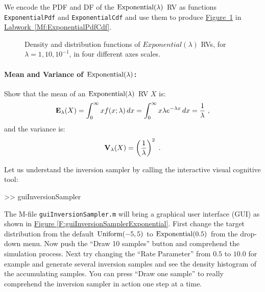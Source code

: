 We encode the PDF and DF of the $\mbox{{\rm Exponential}}(\lambda)$ RV as \Matlab functions {\tt ExponentialPdf} and {\tt ExponentialCdf} and use them to produce \hyperref[F:plotPdfCdfExponentials]{Figure~\ref*{F:plotPdfCdfExponentials}} in \hyperref[Mf:ExponentialPdfCdf]{Labwork~\ref*{Mf:ExponentialPdfCdf}}.

\begin{figure}[htpb]
\caption{Density and distribution functions of $Exponential(\lambda)$ RVs, for $\lambda=1, 10, 10^{-1}$, in four different axes scales.\label{F:plotPdfCdfExponentials}}
\centering   {}
\end{figure}

\paragraph{Mean and Variance of $\mbox{{\rm Exponential}}(\lambda)$:}
Show that the mean of an $\mbox{{\rm Exponential}}(\lambda)$ RV $X$ is:
\[
\mathbf{E}_{\lambda}(X) = \int_{0}^{\infty} x f(x;\lambda)\,dx
=   \int_{0}^{\infty} x \lambda e^{-\lambda x}\,dx
= \frac{1}{\lambda} \ ,
\]
and the variance is:
\[
\mathbf{V}_{\lambda}(X) = \left(  \frac{1}{\lambda} \right)^2 \ .
\]

\begin{labwork}\label{LW:guiInversionSamplerExponential}
Let us understand the inversion sampler by calling the interactive visual cognitive tool:
\begin{VrbM}
>> guiInversionSampler
\end{VrbM}
The M-file {\tt guiInversionSampler.m} will bring a graphical user interface (GUI) as shown in \hyperref[F:guiInversionSamplerExponential]{Figure \ref*{F:guiInversionSamplerExponential}}.  First change the target distribution from the default $\mbox{{\rm Uniform}}(-5,5)$ to $\mbox{{\rm Exponential}}(0.5)$ from the drop-down menu.  Now push the ``Draw 10 samples'' button and comprehend the simulation process.  Next try changing the ``Rate Parameter'' from $0.5$ to $10.0$ for example  and generate several inversion samples and see the density histogram of the accumulating samples.  You can press ``Draw one sample'' to really comprehend the inversion sampler in action one step at a time.
\end{labwork}

